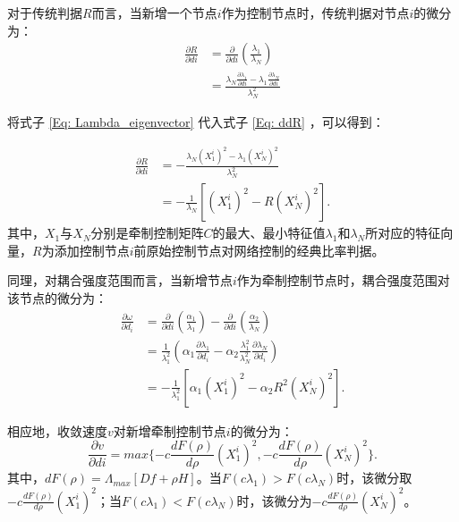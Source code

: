 对于传统判据$ R $而言，当新增一个节点$ i $作为控制节点时，传统判据对节点$ i $的微分为：
\begin{equation}
\begin{aligned}
\frac{\partial R}{\partial di} &= \frac{\partial}{\partial di}(\frac{\lambda_1}{\lambda_N})
\\
&= \frac{\lambda_N\frac{\partial \lambda_1}{\partial di}-\lambda_1\frac{\partial \lambda_N}{\partial di}}{\lambda_N^2}
\end{aligned}
\label{Eq: ddR}
\end{equation}

将式子 \ref{Eq: Lambda_eigenvector} 代入式子 \ref{Eq: ddR} ，可以得到：

\begin{equation}
\begin{aligned}
\frac{\partial R}{\partial di} &= -\frac{ \lambda_N(X_1^i)^2 - \lambda_1(X_N^i)^2}{\lambda_N^2}
\\
&=-\frac{1}{\lambda_N}[(X_1^i)^2-R(X_N^i)^2].
\end{aligned}
\label{Eq: dR}
\end{equation}
其中，$ X_1 $与$ X_N $分别是牵制控制矩阵$ C $的最大、最小特征值$ \lambda_1 $和$ \lambda_N $所对应的特征向量，$ R $为添加控制节点$ i $前原始控制节点对网络控制的经典比率判据。

同理，对耦合强度范围而言，当新增节点$ i $作为牵制控制节点时，耦合强度范围对该节点的微分为：
\begin{equation}
\begin{aligned}
\frac{\partial \omega}{\partial{d_{i}}} &= \frac{\partial}{\partial di}(\frac{\alpha_1}{\lambda_1}) - \frac{\partial}{\partial di}(\frac{\alpha_2}{\lambda_N})
\\
&=\frac{1}{\lambda_1^2}(\alpha_1\frac{\partial \lambda_1}{\partial d_i} - \alpha_2\frac{\lambda_1^2}{\lambda_N^2}\frac{\partial\lambda_N}{\partial d_i})
\\
&= -\frac{1}{\lambda_1^2}[\alpha_1(X_1^i)^2-\alpha_2R^2(X_N^i)^2].
\end{aligned}
\label{Eq:orginperturb2}
\end{equation}

相应地，收敛速度$ v $对新增牵制控制节点$ i $的微分为：
\begin{equation}
\frac{\partial v}{\partial di}=max\{-c\frac{dF(\rho)}{d\rho}(X_1^i)^2,-c\frac{dF(\rho)}{d\rho}(X_N^i)^2\}.
\label{Eq: dv}
\end{equation}
其中，$ dF(\rho) = \Lambda_{max}[Df+\rho H] $。当$ F(c\lambda_1)>F(c\lambda_N)$时，该微分取$ -c\frac{dF(\rho)}{d\rho}(X_1^i)^2 $；当$ F(c\lambda_1)<F(c\lambda_N)$时，该微分为$ -c\frac{dF(\rho)}{d\rho}(X_N^i)^2 $。

